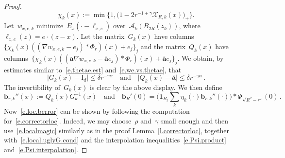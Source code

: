 \documentclass[11pt,twoside]{article} %
\numberwithin{equation}{section}
\theoremstyle{definition}
\newcommand*{\Id}{\ensuremath{\mathrm{I}_d}}
\renewcommand{\b}{\ensuremath{\mathbf{b}}}
\newcommand{\qand}{\quad \mbox{and} \quad }
\renewcommand{\a}{\mathbf{a}}
\newcommand{\ahom}{\bar{\a}}
\newcommand{\X}{\mathcal{X}}
\newcommand{\indc}{\boldsymbol{1}}
\newcommand{\minscale}{\chi}
\newcommand{\A}{\mathcal{A}}
\begin{document}
\begin{proof}
\begin{equation*}  
\minscale_{k}(x) := \min\big\{1, \bigl(1  - 2 r^{-1+\gamma} \X_{R,k}(x) \bigr)_+ \big\} .
\end{equation*}
Let~$w_{x,e,k}$ minimize~$E_x( \cdot - \ell_{x,e})$ over~$\A_k(B_{2R}(z_k))$, where~$\ell_{x,e}(z) = e \cdot (z-x)$. Let the matrix~$G_{k}(x)$ have columns~$\{\minscale_{k}(x) ( (\nabla w_{x,e,k} - e_j) \ast \Phi_{r})(x) + e_j \}_j$ and the matrix~$Q_{k}(x)$ have columns~$\{\minscale_{k}(x)  ( (\a \nabla w_{x,e,k} - \ahom e_j) \ast \Phi_{r}) (x) + \ahom e_j\}_j$. We obtain, by estimates similar to~\eqref{e.thetae.est} and~\eqref{e.we.vs.thetae}, that
\begin{equation}  \label{e.Jk.Qk}
\big| G_{k}(x) - \Id \big| \leq \delta r^{- \gamma\alpha} 
\qand 
\big| Q_{k}(x) - \ahom \big| \leq \delta r^{- \gamma\alpha} 
\,.
\end{equation}
The invertibility of~$G_{k}(x)$ is clear by the above display. We then define 
\begin{equation*}  
\b_{r,k}''(x) := Q_{k}(x)  G_{k}^{-1}(x)
\qand
\b_R'(0) = \biggl( \indc_{B_t} \sum_{k} \eta_k(\cdot)  \b_{r,k}''(\cdot) \biggr)  \ast \Phi_{\sqrt{R^2-r^2}}(0)\,.
\end{equation*}
Now~\eqref{e.loc.berror} can be shown by following the computation for~\eqref{e.correctorloc}. Indeed, we may choose~$\rho$ and~$\gamma$ small enough and then use~\eqref{e.localmagic} similarly as in the proof Lemma~\ref{l.correctorloc}, together with~\eqref{e.local.uglyG.cond} and the interpolation inequalities~\eqref{e.Psi.product} and~\eqref{e.Psi.interpolation}.

\smallskip


\end{proof}
\end{document}
